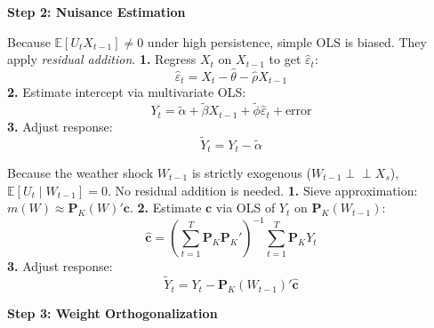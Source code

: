 \documentclass[11pt,landscape]{article}
\begin{document}
\vspace{1em}
\noindent\hrulefill
\vspace{1em}

\noindent\textbf{\large Step 2: Nuisance Estimation} \vspace{0.5em}

\noindent
\begin{minipage}[t]{0.48\textwidth}
Because $\mathbb{E}[U_t X_{t-1}] \neq 0$ under high persistence, simple OLS is biased. They apply \textit{residual addition}. \newline
\textbf{1.} Regress $X_t$ on $X_{t-1}$ to get $\widehat{\varepsilon}_t$:
\begin{equation}
    \widehat{\varepsilon}_t = X_t - \widehat{\theta} - \widehat{\rho} X_{t-1}
\end{equation}
\textbf{2.} Estimate intercept via multivariate OLS:
\begin{equation}
    Y_t = \widetilde{\alpha} + \widetilde{\beta} X_{t-1} + \widetilde{\phi} \widehat{\varepsilon}_t + \text{error}
\end{equation}
\textbf{3.} Adjust response:
\begin{equation}
    \widetilde{Y}_t = Y_t - \widetilde{\alpha}
\end{equation}
\end{minipage}%
\hfill
\begin{minipage}[t]{0.48\textwidth}
Because the weather shock $W_{t-1}$ is strictly exogenous ($W_{t-1} \perp \!\!\! \perp X_s$), $\mathbb{E}[U_t \mid W_{t-1}] = 0$. No residual addition is needed. \newline
\textbf{1.} Sieve approximation: $m(W) \approx \bm{P}_K(W)'\bm{c}$. \newline
\textbf{2.} Estimate $\bm{c}$ via OLS of $Y_t$ on $\bm{P}_K(W_{t-1})$:
\begin{equation}
    \widehat{\bm{c}} = \left( \sum_{t=1}^T \bm{P}_K \bm{P}_K' \right)^{-1} \sum_{t=1}^T \bm{P}_K Y_t
\end{equation}
\textbf{3.} Adjust response:
\begin{equation}
    \widetilde{Y}_t = Y_t - \bm{P}_K(W_{t-1})'\widehat{\bm{c}}
\end{equation}
\end{minipage}

\vspace{1em}
\noindent\hrulefill
\vspace{1em}

\noindent\textbf{\large Step 3: Weight Orthogonalization} \vspace{0.5em}
\end{document}
